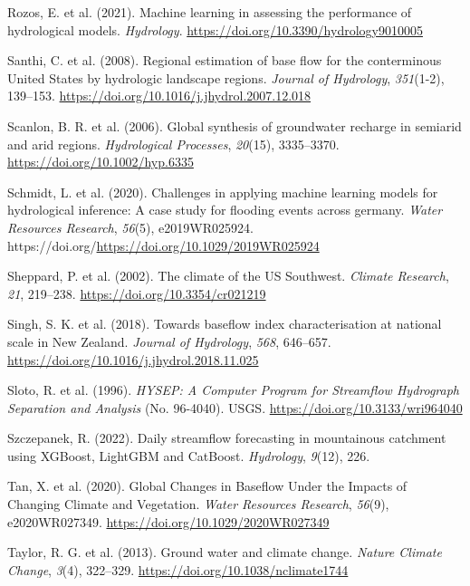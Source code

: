 \documentclass[
]{agujournal2019}
\newlength{\cslhangindent}
\newenvironment{CSLReferences}[2] %
 {\begin{list}{}{%
  \setlength{\itemindent}{0pt}
  \setlength{\leftmargin}{0pt}
  \setlength{\parsep}{0pt}
  \ifodd #1
   \setlength{\leftmargin}{\cslhangindent}
   \setlength{\itemindent}{-1\cslhangindent}
  \fi
  \setlength{\itemsep}{#2\baselineskip}}}
 {\end{list}}
\begin{document}
\begin{CSLReferences}{1}{0}
Rozos, E. et al. (2021). Machine learning in assessing the performance
of hydrological models. \emph{Hydrology}.
\url{https://doi.org/10.3390/hydrology9010005}

Santhi, C. et al. (2008). Regional estimation of base flow for the
conterminous United States by hydrologic landscape regions.
\emph{Journal of Hydrology}, \emph{351}(1-2), 139--153.
\url{https://doi.org/10.1016/j.jhydrol.2007.12.018}

Scanlon, B. R. et al. (2006). Global synthesis of groundwater recharge
in semiarid and arid regions. \emph{Hydrological Processes},
\emph{20}(15), 3335--3370. \url{https://doi.org/10.1002/hyp.6335}

Schmidt, L. et al. (2020). Challenges in applying machine learning
models for hydrological inference: A case study for flooding events
across germany. \emph{Water Resources Research}, \emph{56}(5),
e2019WR025924.
https://doi.org/\url{https://doi.org/10.1029/2019WR025924}

Sheppard, P. et al. (2002). The climate of the US Southwest.
\emph{Climate Research}, \emph{21}, 219--238.
\url{https://doi.org/10.3354/cr021219}

Singh, S. K. et al. (2018). Towards baseflow index characterisation at
national scale in New Zealand. \emph{Journal of Hydrology}, \emph{568},
646--657. \url{https://doi.org/10.1016/j.jhydrol.2018.11.025}

Sloto, R. et al. (1996). \emph{HYSEP: A Computer Program for Streamflow
Hydrograph Separation and Analysis} (No. 96-4040). {USGS}.
\url{https://doi.org/10.3133/wri964040}

Szczepanek, R. (2022). Daily streamflow forecasting in mountainous
catchment using XGBoost, LightGBM and CatBoost. \emph{Hydrology},
\emph{9}(12), 226.

Tan, X. et al. (2020). Global Changes in Baseflow Under the Impacts of
Changing Climate and Vegetation. \emph{Water Resources Research},
\emph{56}(9), e2020WR027349. \url{https://doi.org/10.1029/2020WR027349}

Taylor, R. G. et al. (2013). Ground water and climate change.
\emph{Nature Climate Change}, \emph{3}(4), 322--329.
\url{https://doi.org/10.1038/nclimate1744}


\end{CSLReferences}
\end{document}
